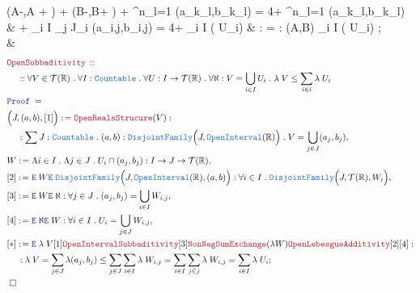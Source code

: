 \documentclass[12pt]{scrartcl}
\newcommand{\TYPE}[1]{\textcolor{NavyBlue}{\mathtt{#1}}}
\newcommand{\LOGIC}[1]{\textcolor{Blue}{\mathtt{#1}}}
\newcommand{\THM}[1]{\textcolor{Maroon}{\mathtt{#1}}}
\renewcommand{\.}{\; . \;}
\newcommand{\de}{: \kern 0.1pc =}
\newcommand{\Theorem}[2]{& \THM{#1} \, :: \, #2 \\ & \Proof = \\ }
\newcommand{\NewLine}{\\ & \kern 1pc}
\newcommand{\Page}[1]{ \begin{align*} #1 \end{align*}   }
\newcommand{\Reals}{\mathbb{R} }
\newcommand{\Say}[3]{& #1 \de #2 : #3, \\}
\newcommand{\Conclude}[3]{& #1 \de #2 : #3; \\}
\newcommand{\DeriveConclude}[3]{& \leadsto #1 \de #2 : #3 ; \\}
\newcommand{\QED}{\; \square}
\newcommand{\EndProof}{& \QED \\}
\newcommand{\Proof}{\LOGIC{Proof} \; }
\newcommand{\Elim}{\LOGIC{E} \; }
\newcommand{\T}{\mathcal{T}}
\newcommand{\OI}{\TYPE{OpenInterval}}
\begin{document}
{{			\lambda(A-\varepsilon,A + \varepsilon) + 
			\lambda(B-\varepsilon,B+ \varepsilon)  
			+ \sum^n_{l=1} \lambda(a_{k_l},b_{k_l}) =
			4\varepsilon +   \sum^n_{l=1} \lambda(a_{k_l},b_{k_l}) \le \NewLine {}\varepsilon + \sum_{i \in I} \sum_{j \in J_i} \lambda(a_{i,j},b_{i,j}) =
			4\varepsilon + \sum_{i \in I} \lambda( U_i)
	}
	\DeriveConclude{[*]}{\THM{LimitIneq}}
	{
		\lambda(A,B)  \le  \sum_{i \in I} \lambda( U_i)
	}
	\EndProof
}\Page{
	\Theorem{OpenSubbaditivity}
	{
		\NewLine ::		
		\forall V \in \T(\Reals) \.
		\forall I : \TYPE{Countable} \.
		\forall U : I \to \T(\Reals) \.
		\forall \aleph : V = \bigcup_{i \in I} U_i \.
		\lambda\;V \le \sum_{i \in i} \lambda\;U_i 
	}
	\Say{\Big(J,(a,b),[1] \Big)}
	{
		\THM{OpenRealsStrucure}(V)
	}
	{		
		\NewLine :		
		\sum J : \TYPE{Countable} \. 
		(a,b) : \TYPE{DisjointFamily}\Big(J, \OI(\Reals) \Big)\.
		V = \bigcup_{j \in J} (a_j,b_j)
	}
	\Say{W}
	{
		\Lambda i \in I \.
		\Lambda j \in J \.
		U_i \cap (a_j,b_j)
	}
	{
		I \to J \to \T(\Reals)
	}
	\Say{[2]}{\Elim W \Elim  \TYPE{DisjointFamily}\Big(J, \OI(\Reals), (a,b) \Big) }
	{
		\forall i \in I \.
		\TYPE{DisjointFamily}\Big(J, \T(\Reals), W_i \Big) 
	}
	\Say{[3]}{\Elim W \Elim \aleph}
	{
		\forall j \in J \. (a_j,b_j) =\bigcup_{i \in I} W_{i,j}
	}
	\Say{[4]}{\Elim \aleph \Elim W }
	{
		\forall i \in I \. U_i =\bigcup_{j \in J} W_{i,j}
	}
	\Conclude{[*]}
	{
		\Elim \lambda \; V [1]
		\THM{OpenIntervalSubbaditivity}[3]
		\THM{NonNegSumExchange}(\lambda W)
		\THM{OpenLebesgueAdditivity}[2][4]
	}
	{
		\NewLine :		
		\lambda \; V = \sum_{j \in J} \lambda(a_j,b_j)  \le 
		\sum_{j \in J} \sum_{i \in I}	\lambda \; W_{i,j} =
		\sum_{i \in I} \sum_{j \in j} \lambda \; W_{i,j} = 
		\sum_{i \in I} \lambda \; U_i
	}	
	\EndProof
}
\newpage
\end{document}
